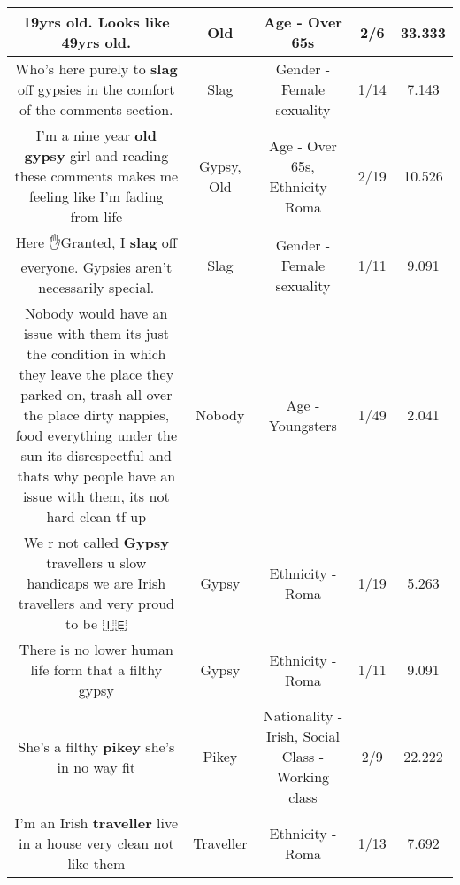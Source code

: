 \documentclass[11pt]{article}
\newlength\mylength
\begin{document}
\begin{center}
\begin{longtable}{|C{.65\mylength}|C{.30\mylength}|C{.12\mylength}|C{.12\mylength}|C{.12\mylength}|}
  \small 19yrs \textbf{old}. Looks like 49yrs \textbf{old}.\normalsize   & Old & Age - Over 65s & 2/6 & 33.333 \\  \hline
  \small Who's here purely to \textbf{slag} off gypsies in the comfort of the comments section.\normalsize   & Slag & Gender - Female sexuality & 1/14 & 7.143 \\  \hline
  \small I'm a nine year \textbf{old} \textbf{gypsy} girl and reading these comments makes me feeling like I'm fading from life\normalsize   & Gypsy, Old & Age - Over 65s, Ethnicity - Roma & 2/19 & 10.526 \\  \hline
  \small Here ✋Granted, I \textbf{slag} off everyone. Gypsies aren't necessarily special.\normalsize   & Slag & Gender - Female sexuality & 1/11 & 9.091 \\  \hline
  \small Nobody would have an issue with them its just the condition in which they leave the place they parked on, trash all over the place dirty nappies, food everything under the sun its disrespectful and thats why people have an issue with them, its not hard clean tf up\normalsize   & Nobody & Age - Youngsters & 1/49 & 2.041 \\  \hline
  \small We r not called \textbf{Gypsy} travellers u slow handicaps we are Irish travellers and very proud to be 🇮🇪\normalsize   & Gypsy & Ethnicity - Roma & 1/19 & 5.263 \\  \hline
  \small There is no lower human life form that a filthy gypsy\normalsize   & Gypsy & Ethnicity - Roma & 1/11 & 9.091 \\  \hline
  \small She's a filthy \textbf{p\textbf{ikey}} she's in no way fit\normalsize   & Pikey & Nationality - Irish, Social Class - Working class & 2/9 & 22.222 \\  \hline
  \small I'm an Irish \textbf{traveller} live in a house very clean not like them\normalsize   & Traveller & Ethnicity - Roma & 1/13 & 7.692 \\  \hline

\end{longtable}
\end{center}
\end{document}

